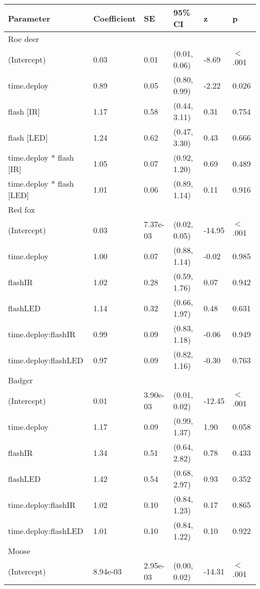 \begin{table}[ht]
\centering
\begin{tabular}{llllll}
  \hline
Parameter & Coefficient & SE & 95\% CI & z & p \\ 
  \hline
Roe deer &  &  &  &  &        \\ 
  (Intercept) & 0.03 & 0.01 & (0.01, 0.06) & -8.69 & $<$ .001 \\ 
  time.deploy & 0.89 & 0.05 & (0.80, 0.99) & -2.22 & 0.026  \\ 
  flash [IR] & 1.17 & 0.58 & (0.44, 3.11) & 0.31 & 0.754  \\ 
  flash [LED] & 1.24 & 0.62 & (0.47, 3.30) & 0.43 & 0.666  \\ 
  time.deploy * flash [IR] & 1.05 & 0.07 & (0.92, 1.20) & 0.69 & 0.489  \\ 
  time.deploy * flash [LED] & 1.01 & 0.06 & (0.89, 1.14) & 0.11 & 0.916  \\ 
  Red fox &  &  &  &  &        \\ 
  (Intercept) & 0.03 & 7.37e-03 & (0.02, 0.05) & -14.95 & $<$ .001 \\ 
  time.deploy & 1.00 & 0.07 & (0.88, 1.14) & -0.02 & 0.985  \\ 
  flashIR & 1.02 & 0.28 & (0.59, 1.76) & 0.07 & 0.942  \\ 
  flashLED & 1.14 & 0.32 & (0.66, 1.97) & 0.48 & 0.631  \\ 
  time.deploy:flashIR & 0.99 & 0.09 & (0.83, 1.18) & -0.06 & 0.949  \\ 
  time.deploy:flashLED & 0.97 & 0.09 & (0.82, 1.16) & -0.30 & 0.763  \\ 
  Badger &  &  &  &  &        \\ 
  (Intercept) & 0.01 & 3.90e-03 & (0.01, 0.02) & -12.45 & $<$ .001 \\ 
  time.deploy & 1.17 & 0.09 & (0.99, 1.37) & 1.90 & 0.058  \\ 
  flashIR & 1.34 & 0.51 & (0.64, 2.82) & 0.78 & 0.433  \\ 
  flashLED & 1.42 & 0.54 & (0.68, 2.97) & 0.93 & 0.352  \\ 
  time.deploy:flashIR & 1.02 & 0.10 & (0.84, 1.23) & 0.17 & 0.865  \\ 
  time.deploy:flashLED & 1.01 & 0.10 & (0.84, 1.22) & 0.10 & 0.922  \\ 
  Moose &  &  &  &  &        \\ 
  (Intercept) & 8.94e-03 & 2.95e-03 & (0.00, 0.02) & -14.31 & $<$ .001 \\ 

\end{tabular}
\end{table}
